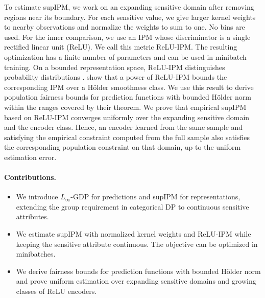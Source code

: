 \documentclass{article} %
\begin{document}
To estimate supIPM, we work on an expanding sensitive domain after removing regions near its boundary.  For each sensitive value, we give larger kernel weights to nearby observations and normalize the weights to sum to one.  No bins are used.  For the inner comparison, we use an IPM whose discriminator is a single rectified linear unit (ReLU).  We call this metric ReLU-IPM.  The resulting optimization has a finite number of parameters and can be used in minibatch training.  On a bounded representation space, ReLU-IPM distinguishes probability distributions \citep{park2025relu}.  \citet{park2025relu} show that a power of ReLU-IPM bounds the corresponding IPM over a H\"older smoothness class.  We use this result to derive population fairness bounds for prediction functions with bounded H\"older norm within the ranges covered by their theorem.  We prove that empirical supIPM based on ReLU-IPM converges uniformly over the expanding sensitive domain and the encoder class.  Hence, an encoder learned from the same sample and satisfying the empirical constraint computed from the full sample also satisfies the corresponding population constraint on that domain, up to the uniform estimation error.

\paragraph{Contributions.}
\begin{itemize}
  \item We introduce $L_{\infty}$-GDP for predictions and supIPM for representations, extending the group requirement in categorical DP to continuous sensitive attributes.
  \item We estimate supIPM with normalized kernel weights and ReLU-IPM while keeping the sensitive attribute continuous.  The objective can be optimized in minibatches.
  \item We derive fairness bounds for prediction functions with bounded H\"older norm and prove uniform estimation over expanding sensitive domains and growing classes of ReLU encoders.
\end{itemize}



\end{document}
